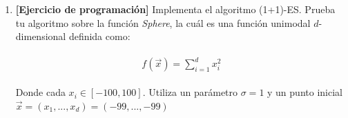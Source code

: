 \documentclass[10pt,letterpaper]{article}
\begin{document}
\begin{enumerate}
    \item \textbf{[Ejercicio de programación]} Implementa el algoritmo (1+1)-ES. Prueba
          tu algoritmo sobre la función \textit{Sphere}, la cuál es una función unimodal
          $d$-dimensional definida como:

        \begin{equation*} \begin{split} \begin{gathered}
            f(\vec{x}) = \sum_{i=1}^d x_i^2
        \end{gathered} \end{split} \end{equation*}

        Donde cada $x_i \in [-100, 100]$. Utiliza un parámetro $\sigma = 1$ y un punto
        inicial $\vec{x} = (x_1, ..., x_d) = (-99,...,-99)$
\end{enumerate}
\end{document}
